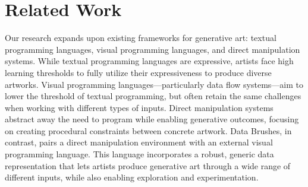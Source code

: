 \documentclass{sigchi}
\newcommand {\jen}[1]{{\color{teal}\bf{JJ: #1}\normalfont}}
\begin{document}
\section{Related Work}
Our research expands upon existing frameworks for generative art: textual programming languages, visual programming languages, and direct manipulation systems. While textual programming languages are expressive, artists face high learning thresholds to fully utilize their expressiveness to produce diverse artworks. %
Visual programming languages---particularly data flow systems---aim to lower the threshold of textual programming, but often retain the same challenges when working with different types of inputs. Direct manipulation systems abstract away the need to program while enabling generative outcomes, focusing on creating procedural constraints between concrete artwork. %
Data Brushes, in contrast, pairs a direct manipulation environment with an external visual programming language. This language incorporates a robust, generic data representation that lets artists produce generative art through a wide range of different inputs, while also enabling exploration and experimentation.
\end{document}
